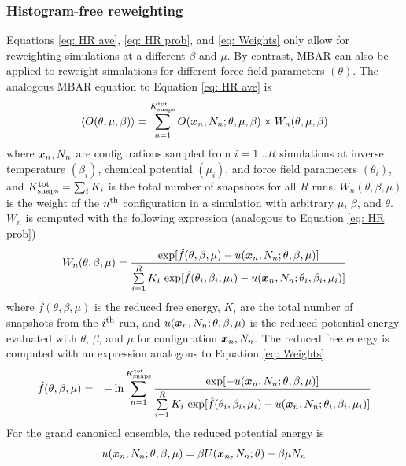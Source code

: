 \documentclass[journal=jced,manuscript=article]{achemso}
\newcommand{\bfv}[1]{{\mbox{\boldmath{$#1$}}}}
\newcommand{\x}{\bfv{x}}
\begin{document}
\subsubsection{Histogram-free reweighting} \label{sec: MBAR}

Equations \ref{eq: HR ave}, \ref{eq: HR prob}, and \ref{eq: Weights} only allow for reweighting simulations at a different $\beta$ and $\mu$. By contrast, MBAR can also be applied to reweight simulations for different force field parameters $(\theta)$. The analogous MBAR equation to Equation \ref{eq: HR ave} is
\begin{eqnarray} \label{eq: MBAR ave}
\langle O(\theta,\mu,\beta)\rangle = \sum_{n=1}^{K^{\rm tot}_{\rm snaps}} O(\x_{n},N_n;\theta,\mu,\beta) \times W_{n}(\theta,\mu,\beta)
\end{eqnarray}
where $\x_n,N_n$ are configurations sampled from $i=1 \ldots R$ simulations at inverse temperature $(\beta_{i})$, chemical potential $(\mu_{i})$, and force field parameters $(\theta_i)$, and $K^{\rm tot}_{\rm snaps} = \sum_i K_i$ is the total number of snapshots for all $R$ runs. $W_{n}(\theta,\beta,\mu)$ is the weight of the $n^{\rm th}$ configuration in a simulation with arbitrary $\mu$, $\beta$, and $\theta$. $W_{n}$ is computed with the following expression (analogous to Equation \ref{eq: HR prob})
\begin{eqnarray} \label{eq: MBAR weights}
W_{n}(\theta,\beta,\mu) = \frac{\exp[\hat{f}(\theta,\beta,\mu)-u(\x_{n},N_n;\theta,\beta,\mu)]}{\sum\limits_{i=1}^R K_i \, \exp[\hat{f}(\theta_i,\beta_{i},\mu_{i}) - u(\x_{n},N_n;\theta_i,\beta_{i},\mu_{i})]}
\end{eqnarray}
where $\hat f(\theta,\beta,\mu)$ is the reduced free energy, $K_i$ are the total number of snapshots from the $i^{\rm th}$ run, and $u(\x_{n},N_n;\theta,\beta,\mu)$ is the reduced potential energy evaluated with $\theta$, $\beta$, and $\mu$ for configuration $\x_n,N_n$. The reduced free energy is computed with an expression analogous to Equation \ref{eq: Weights}
\begin{eqnarray} \label{eq: MBAR free energy}
\hat f(\theta,\beta,\mu) &=& - \ln \sum_{n=1}^{K^{\rm tot}_{\rm snaps}}
\frac{\exp[-u(\x_{n},N_n;\theta,\beta,\mu)]}{\sum\limits_{i=1}^R K_i \, \exp[\hat{f}(\theta_i,\beta_{i},\mu_{i}) - u(\x_{n},N_n;\theta_i,\beta_{i},\mu_{i})]}
\end{eqnarray}
For the grand canonical ensemble, the reduced potential energy is
\begin{equation} \label{eq: reduced potential}
u(\x_{n},N_n;\theta,\beta,\mu) = \beta U(\x_n,N_n;\theta) - \beta \mu N_n
\end{equation} 
\end{document}
